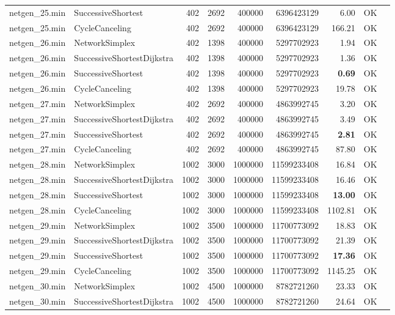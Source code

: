 \begin{longtable}{llrrrrrrl}
netgen\_25.min & SuccessiveShortest & 402 & 2692 & 400000 & 6396423129 & 6.00 & OK \\
netgen\_25.min & CycleCanceling & 402 & 2692 & 400000 & 6396423129 & 166.21 & OK \\
\midrule
netgen\_26.min & NetworkSimplex & 402 & 1398 & 400000 & 5297702923 & 1.94 & OK \\
netgen\_26.min & SuccessiveShortestDijkstra & 402 & 1398 & 400000 & 5297702923 & 1.36 & OK \\
netgen\_26.min & SuccessiveShortest & 402 & 1398 & 400000 & 5297702923 & \textbf{0.69} & OK \\
netgen\_26.min & CycleCanceling & 402 & 1398 & 400000 & 5297702923 & 19.78 & OK \\
\midrule
netgen\_27.min & NetworkSimplex & 402 & 2692 & 400000 & 4863992745 & 3.20 & OK \\
netgen\_27.min & SuccessiveShortestDijkstra & 402 & 2692 & 400000 & 4863992745 & 3.49 & OK \\
netgen\_27.min & SuccessiveShortest & 402 & 2692 & 400000 & 4863992745 & \textbf{2.81} & OK \\
netgen\_27.min & CycleCanceling & 402 & 2692 & 400000 & 4863992745 & 87.80 & OK \\
\midrule
netgen\_28.min & NetworkSimplex & 1002 & 3000 & 1000000 & 11599233408 & 16.84 & OK \\
netgen\_28.min & SuccessiveShortestDijkstra & 1002 & 3000 & 1000000 & 11599233408 & 16.46 & OK \\
netgen\_28.min & SuccessiveShortest & 1002 & 3000 & 1000000 & 11599233408 & \textbf{13.00} & OK \\
netgen\_28.min & CycleCanceling & 1002 & 3000 & 1000000 & 11599233408 & 1102.81 & OK \\
\midrule
netgen\_29.min & NetworkSimplex & 1002 & 3500 & 1000000 & 11700773092 & 18.83 & OK \\
netgen\_29.min & SuccessiveShortestDijkstra & 1002 & 3500 & 1000000 & 11700773092 & 21.39 & OK \\
netgen\_29.min & SuccessiveShortest & 1002 & 3500 & 1000000 & 11700773092 & \textbf{17.36} & OK \\
netgen\_29.min & CycleCanceling & 1002 & 3500 & 1000000 & 11700773092 & 1145.25 & OK \\
\midrule
netgen\_30.min & NetworkSimplex & 1002 & 4500 & 1000000 & 8782721260 & 23.33 & OK \\
netgen\_30.min & SuccessiveShortestDijkstra & 1002 & 4500 & 1000000 & 8782721260 & 24.64 & OK \\

\end{longtable}
